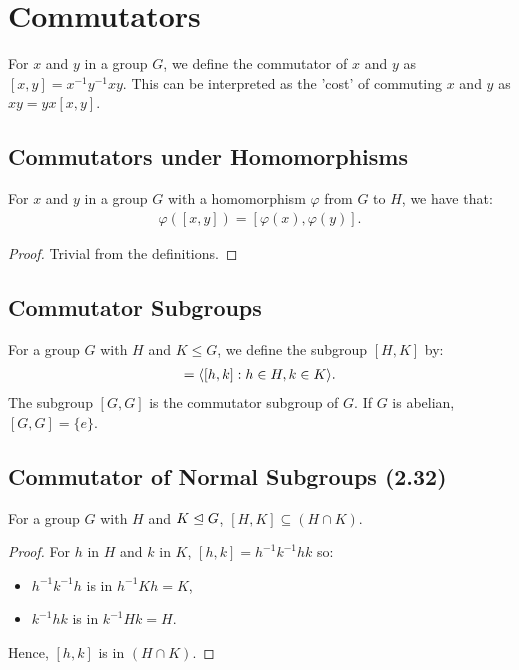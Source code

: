 \section{Commutators} 

For $x$ and $y$ in a group $G$, we define the commutator
of $x$ and $y$ as $[x, y] = x^{-1}y^{-1}xy$.
This can be interpreted as the 'cost' of commuting
$x$ and $y$ as $xy = yx[x, y]$.

\subsection{Commutators under Homomorphisms} \label{eq2.3}

For $x$ and $y$ in a group $G$ with a homomorphism $\varphi$ from $G$ to $H$, 
we have that: \begin{align*}
    \varphi([x, y]) = [\varphi(x), \varphi(y)].
\end{align*}

\begin{proof}
    Trivial from the definitions.
\end{proof}

\subsection{Commutator Subgroups}

For a group $G$ with $H$ and $K \leq G$, we define the subgroup $[H, K]$ by:
\begin{align*}
    [H, K] = \ang{[h, k] : h \in H, k \in K}.
\end{align*} The subgroup $[G, G]$ is the commutator subgroup of $G$.
If $G$ is abelian, $[G, G] = \{e\}$.

\subsection{Commutator of Normal Subgroups (2.32)} \label{2.32}

For a group $G$ with $H$ and $K \trianglelefteq G$, $[H, K] \subseteq (H \cap K)$.

\begin{proof}
    For $h$ in $H$ and $k$ in $K$, $[h, k] = h^{-1}k^{-1}hk$ so: \begin{itemize}
        \item $h^{-1}k^{-1}h$ is in $h^{-1}Kh = K$,
        \item $k^{-1}hk$ is in $k^{-1}Hk = H$.
    \end{itemize} Hence, $[h, k]$ is in $(H \cap K)$.
\end{proof} 


